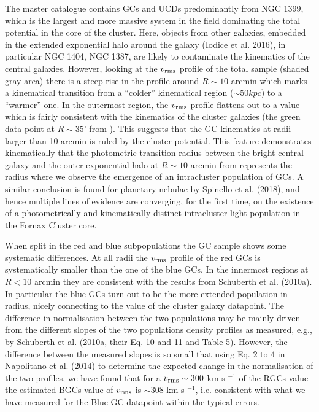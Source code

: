 \documentclass[useAMS,usenatbib]{mn2e}
\begin{document}
The master catalogue contains GCs and UCDs predominantly from NGC 1399, which is the largest and more massive system in the field dominating the total potential in the core of the cluster. Here, objects from other galaxies, embedded in the extended exponential halo around the galaxy (Iodice et al. 2016), in particular NGC 1404, NGC 1387, are likely to contaminate the kinematics of the central galaxies. However, looking at the $v_{\rm rms}$ profile of the total sample (shaded gray area) there is a steep rise in the profile around $R\sim10$ arcmin which marks a kinematical transition from a ``colder'' kinematical region ($\sim 50 kpc$) to a ``warmer'' one. In the outermost region, the $v_{\rm rms}$ profile flattens out to a value which is fairly consistent with the kinematics of the cluster galaxies (the green data point at $R\sim35’$ from \citealt{Drinkwater00}). This suggests that the GC kinematics at radii larger than 10 arcmin is ruled by the cluster potential. This feature demonstrates kinematically that the photometric transition radius between the bright central galaxy and the outer exponential halo at $R\sim10$ arcmin from \citet{Iodice16} represents the radius where we observe the emergence of an intracluster population of GCs. A similar conclusion is found for planetary nebulae by Spinello et al. (2018), and hence multiple lines of evidence are converging, for the first time, on the existence of a photometrically and kinematically distinct intracluster light population in the Fornax Cluster core.

When split in the red and blue subpopulations 
the GC sample shows some systematic differences. At all radii the $v_{\rm rms}$ profile of the red GCs is systematically smaller than the one of the blue GCs.  In the innermost regions at $R < 10$ arcmin they are consistent with the results from Schuberth et al. (2010a). In particular the blue GCs turn out to be the more extended population in radius, nicely connecting to the value of the cluster galaxy datapoint. The difference in normalisation between the two populations may be mainly driven from the different slopes of the two populations density profiles as measured, e.g., by Schuberth et al. (2010a, their Eq. 10 and 11 and Table 5). However, the difference between the measured slopes is so small that using Eq. 2 to 4 in Napolitano et al. (2014) to determine the expected change in the normalisation of the two profiles, we have found that for a $v_{\rm rms} \sim 300$ km s $^{-1}$ of the RGCs value the estimated BGCs value of $v_{\rm rms}$ is $\sim 308$ km s $^{-1}$, i.e. consistent with what we have measured for the Blue GC datapoint within the typical errors.
\end{document}
